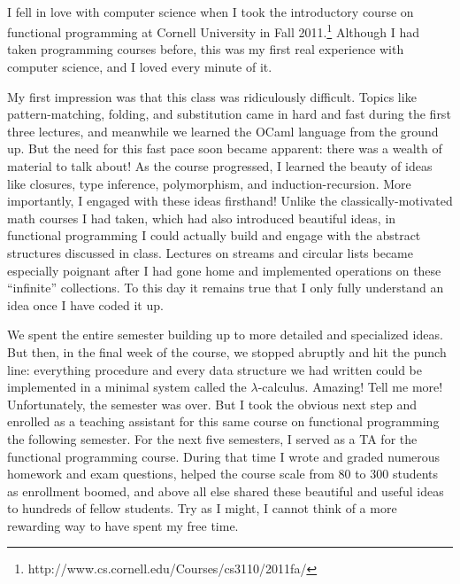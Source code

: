 \documentclass{article}
\renewcommand\maketitle{
{\flushleft{\textsf{%
Ben Greenman
\hfill
DRAFT: NSF Motivation
}}\\
\hrulefill}
}
\begin{document}
\maketitle

I fell in love with computer science when I took the introductory course on functional programming at Cornell University in Fall 2011.\footnote{http://www.cs.cornell.edu/Courses/cs3110/2011fa/}
Although I had taken programming courses before, this was my first real experience with computer science, and I loved every minute of it.

My first impression was that this class was ridiculously difficult.
Topics like pattern-matching, folding, and substitution came in hard and fast during the first three lectures, and meanwhile we learned the OCaml language from the ground up.
But the need for this fast pace soon became apparent: there was a wealth of material to talk about!
As the course progressed, I learned the beauty of ideas like closures, type inference, polymorphism, and induction-recursion.
More importantly, I engaged with these ideas firsthand!
Unlike the classically-motivated math courses I had taken, which had also introduced beautiful ideas, in functional programming I could actually build and engage with the abstract structures discussed in class.
Lectures on streams and circular lists became especially poignant after I had gone home and implemented operations on these ``infinite'' collections.
To this day it remains true that I only fully understand an idea once I have coded it up.

We spent the entire semester building up to more detailed and specialized ideas.
But then, in the final week of the course, we stopped abruptly and hit the punch line: everything procedure and every data structure we had written could be implemented in a minimal system called the $\lambda$-calculus.
Amazing! Tell me more!
Unfortunately, the semester was over.
But I took the obvious next step and enrolled as a teaching assistant for this same course on functional programming the following semester.
For the next five semesters, I served as a TA for the functional programming course.
During that time I wrote and graded numerous homework and exam questions, helped the course scale from 80 to 300 students as enrollment boomed, and above all else shared these beautiful and useful ideas to hundreds of fellow students.
Try as I might, I cannot think of a more rewarding way to have spent my free time.

\vspace{0.5cm}
\end{document}
